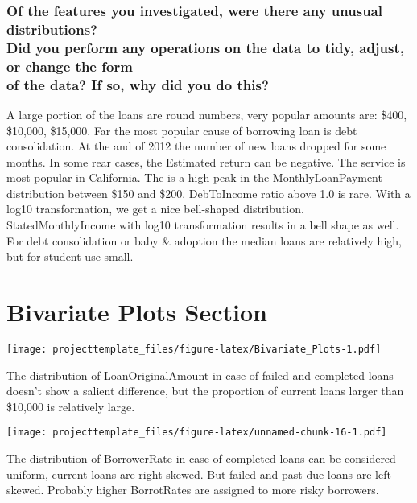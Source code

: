 \documentclass[]{article}
\begin{document}
\subsubsection{\texorpdfstring{Of the features you investigated, were
there any unusual distributions?\\
Did you perform any operations on the data to tidy, adjust, or change
the form\\
of the data? If so, why did you do
this?}{Of the features you investigated, were there any unusual distributions? Did you perform any operations on the data to tidy, adjust, or change the form of the data? If so, why did you do this?}}\label{of-the-features-you-investigated-were-there-any-unusual-distributions-did-you-perform-any-operations-on-the-data-to-tidy-adjust-or-change-the-form-of-the-data-if-so-why-did-you-do-this}

A large portion of the loans are round numbers, very popular amounts
are: \$400, \$10,000, \$15,000. Far the most popular cause of borrowing
loan is debt consolidation. At the and of 2012 the number of new loans
dropped for some months. In some rear cases, the Estimated return can be
negative. The service is most popular in California. The is a high peak
in the MonthlyLoanPayment distribution between \$150 and \$200.
DebToIncome ratio above 1.0 is rare. With a log10 transformation, we get
a nice bell-shaped distribution. StatedMonthlyIncome with log10
transformation results in a bell shape as well. For debt consolidation
or baby \& adoption the median loans are relatively high, but for
student use small.

\section{Bivariate Plots Section}\label{bivariate-plots-section}

\texttt{[image: projecttemplate\_files/figure-latex/Bivariate\_Plots-1.pdf]}

The distribution of LoanOriginalAmount in case of failed and completed
loans doesn't show a salient difference, but the proportion of current
loans larger than \$10,000 is relatively large.

\texttt{[image: projecttemplate\_files/figure-latex/unnamed-chunk-16-1.pdf]}

The distribution of BorrowerRate in case of completed loans can be
considered uniform, current loans are right-skewed. But failed and past
due loans are left-skewed. Probably higher BorrotRates are assigned to
more risky borrowers.
\end{document}
